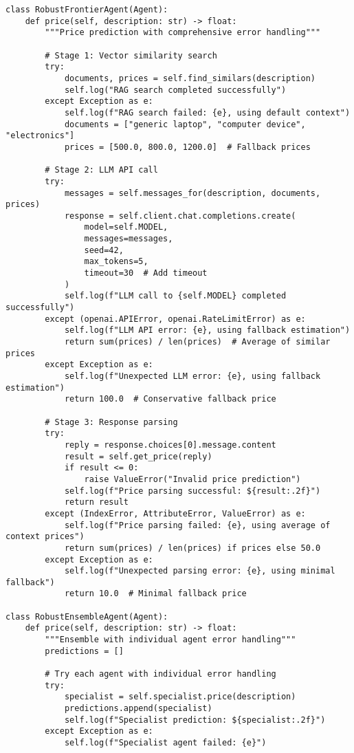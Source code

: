 \begin{lstlisting}[caption=Robust Error Handling Implementation]
class RobustFrontierAgent(Agent):
    def price(self, description: str) -> float:
        """Price prediction with comprehensive error handling"""
        
        # Stage 1: Vector similarity search
        try:
            documents, prices = self.find_similars(description)
            self.log("RAG search completed successfully")
        except Exception as e:
            self.log(f"RAG search failed: {e}, using default context")
            documents = ["generic laptop", "computer device", "electronics"]
            prices = [500.0, 800.0, 1200.0]  # Fallback prices
        
        # Stage 2: LLM API call
        try:
            messages = self.messages_for(description, documents, prices)
            response = self.client.chat.completions.create(
                model=self.MODEL,
                messages=messages,
                seed=42,
                max_tokens=5,
                timeout=30  # Add timeout
            )
            self.log(f"LLM call to {self.MODEL} completed successfully")
        except (openai.APIError, openai.RateLimitError) as e:
            self.log(f"LLM API error: {e}, using fallback estimation")
            return sum(prices) / len(prices)  # Average of similar prices
        except Exception as e:
            self.log(f"Unexpected LLM error: {e}, using fallback estimation")
            return 100.0  # Conservative fallback price
        
        # Stage 3: Response parsing
        try:
            reply = response.choices[0].message.content
            result = self.get_price(reply)
            if result <= 0:
                raise ValueError("Invalid price prediction")
            self.log(f"Price parsing successful: ${result:.2f}")
            return result
        except (IndexError, AttributeError, ValueError) as e:
            self.log(f"Price parsing failed: {e}, using average of context prices")
            return sum(prices) / len(prices) if prices else 50.0
        except Exception as e:
            self.log(f"Unexpected parsing error: {e}, using minimal fallback")
            return 10.0  # Minimal fallback price

class RobustEnsembleAgent(Agent):
    def price(self, description: str) -> float:
        """Ensemble with individual agent error handling"""
        predictions = []
        
        # Try each agent with individual error handling
        try:
            specialist = self.specialist.price(description)
            predictions.append(specialist)
            self.log(f"Specialist prediction: ${specialist:.2f}")
        except Exception as e:
            self.log(f"Specialist agent failed: {e}")
        

\end{lstlisting}
